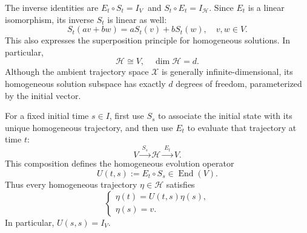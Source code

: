 \documentclass[12pt,a4paper,oneside]{book}
\begin{document}
\begin{example}
\begin{solution}
\begin{center}
\end{center}

The inverse identities are $E_t\circ S_t=I_V\ $ and $S_t\circ E_t=I_{\mathcal H}$. Since $E_t$ is a linear isomorphism,
its inverse $S_t$ is linear as well:
\begin{equation*}
    S_t(av+bw)=aS_t(v)+bS_t(w), \quad v,w\in V.
\end{equation*}
This also expresses the superposition principle for homogeneous solutions. In particular,
\begin{equation*}
    \mathcal H\cong V,\quad \dim\mathcal H=d.
\end{equation*}
Although the ambient trajectory space $\mathcal X$ is generally infinite-dimensional, its homogeneous solution subspace
has exactly $d$ degrees of freedom, parameterized by the initial vector.

For a fixed initial time $s\in I$, first use $S_s$ to associate the initial state with its unique homogeneous trajectory,
and then use $E_t$ to evaluate that trajectory at time $t$:
\begin{equation*}
    V \xrightarrow{\ S_s\ } \mathcal H \xrightarrow{\ E_t\ } V.
\end{equation*}
This composition defines the homogeneous evolution operator
\begin{equation*}
    U(t,s):=E_t\circ S_s \in\operatorname{End}(V).
\end{equation*}
Thus every homogeneous trajectory $\eta\in\mathcal H$ satisfies
\begin{equation*}
    \begin{cases}
        \eta(t)=U(t,s)\eta(s),\\
        \eta(s)=v.
    \end{cases}
\end{equation*}
In particular, $U(s,s)=I_V$.


\end{solution}
\end{example}
\end{document}
